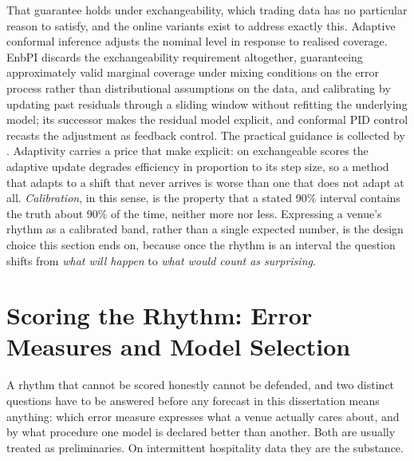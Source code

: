 That guarantee holds under exchangeability, which trading data has no
particular reason to satisfy, and the online variants exist to address exactly
this. Adaptive conformal inference \citep{gibbs_adaptive_2021} adjusts the
nominal level in response to realised coverage. EnbPI \citep{xu_conformal_2021}
discards the exchangeability requirement altogether, guaranteeing approximately
valid marginal coverage under mixing conditions on the error process rather
than distributional assumptions on the data, and calibrating by updating past
residuals through a sliding window without refitting the underlying model; its
successor \citep{xu_sequential_2023} makes the residual model explicit, and
conformal PID control \citep{angelopoulos_conformal_2023-1} recasts the
adjustment as feedback control. The practical guidance is collected by
\citet{stocker_gentle_2025}. Adaptivity carries a price that
\citet{zaffran_adaptive_2022} make explicit: on exchangeable scores the
adaptive update degrades efficiency in proportion to its step size, so a
method that adapts to a shift that never arrives is worse than one that does
not adapt at all. \emph{Calibration}, in this sense, is the property that a
stated 90\% interval contains the truth about 90\% of the time, neither more
nor less. Expressing a venue's rhythm as a calibrated band, rather than a
single expected number, is the design choice this section ends on, because once
the rhythm is an interval the question shifts from \emph{what will happen} to
\emph{what would count as surprising}.

\section{Scoring the Rhythm: Error Measures and Model Selection}
\label{sec:rw-ruler}

A rhythm that cannot be scored honestly cannot be defended, and two distinct
questions have to be answered before any forecast in this dissertation means
anything: which error measure expresses what a venue actually cares about, and
by what procedure one model is declared better than another. Both are usually
treated as preliminaries. On intermittent hospitality data they are the
substance.

